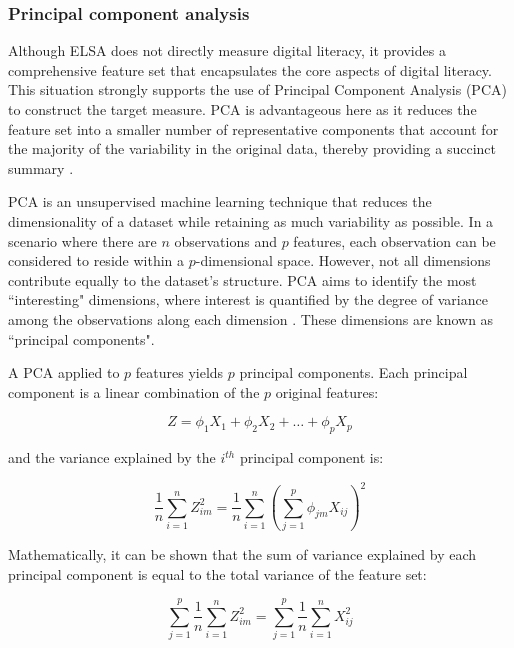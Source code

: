 \subsubsection{Principal component analysis}
Although ELSA does not directly measure digital literacy, it provides a comprehensive feature set that encapsulates the core aspects of digital literacy. This situation strongly supports the use of Principal Component Analysis (PCA) to construct the target measure. PCA is advantageous here as it reduces the feature set into a smaller number of representative components that account for the majority of the variability in the original data, thereby providing a succinct summary \parencite[p. 504]{james_introduction_2023}. 

PCA is an unsupervised machine learning technique that reduces the dimensionality of a dataset while retaining as much variability as possible. In a scenario where there are $n$ observations and $p$ features, each observation can be considered to reside within a $p$-dimensional space. However, not all dimensions contribute equally to the dataset's structure. PCA aims to identify the most ``interesting" dimensions, where interest is quantified by the degree of variance among the observations along each dimension \parencite[p. 505]{james_introduction_2023}. These dimensions are known as ``principal components".

A PCA applied to $p$ features yields $p$ principal components. Each principal component is a linear combination of the $p$ original features:

\begin{equation}
    \label{eq:pca_loadings}
    Z = \phi_{1}X_1 + \phi_{2}X_2 + \ldots + \phi_{p}X_p
\end{equation}

and the variance explained by the $i^{th}$ principal component is:

\begin{equation}
    \label{eq:pca_variance}
    \frac{1}{n} \sum_{i=1}^{n}Z_{im}^2 = \frac{1}{n} \sum_{i=1}^{n} \left( \sum_{j=1}^{p} \phi_{jm}X_{ij} \right)^2
\end{equation}

Mathematically, it can be shown that the sum of variance explained by each principal component is equal to the total variance of the feature set:

\begin{equation}
    \label{eq:pca_total_variance}
    \sum_{j=1}^{p} \frac{1}{n} \sum_{i=1}^{n}Z_{im}^2 = \sum_{j=1}^{p} \frac{1}{n} \sum_{i=1}^{n}X_{ij}^2
\end{equation}

